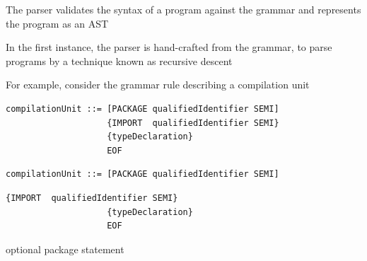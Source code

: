 \documentclass[8pt,a4paper,compress]{beamer}
\begin{document}
\begin{frame}[fragile]
\pause\transdissolve

The parser validates the syntax of a \jmm program against the \jmm grammar and represents the program as an AST

\pause\transdissolve\bigskip

In the first instance, the parser is hand-crafted from the grammar, to parse programs by a technique known as recursive descent

\pause\transdissolve\bigskip

For example, consider the grammar rule describing a compilation unit

\pause\transdissolve\smallskip

\begin{overprint}
\begin{tcolorbox}[enhanced,drop shadow southwest,sharp corners,size=fbox,colback=white,fontlower=\small\ttfamily,collower=silver900]

\begin{lstlisting}[language={},style=focusin]
compilationUnit ::= [PACKAGE qualifiedIdentifier SEMI]
                    {IMPORT  qualifiedIdentifier SEMI}
                    {typeDeclaration} 
                    EOF
\end{lstlisting}

\tcblower
\begin{minipage}[t][.25cm][t]{\textwidth}

\end{minipage}
\end{tcolorbox}

\begin{tcolorbox}[enhanced,drop shadow southwest,sharp corners,size=fbox,colback=white,fontlower=\small\ttfamily,collower=silver900]

\begin{lstlisting}[language={},style=focusin,backgroundcolor=\color{lime100}]
compilationUnit ::= [PACKAGE qualifiedIdentifier SEMI]
\end{lstlisting}
\begin{lstlisting}[language={},style=focusout]
                    {IMPORT  qualifiedIdentifier SEMI}
                    {typeDeclaration} 
                    EOF
\end{lstlisting}

\tcblower
\begin{minipage}[t][.25cm][t]{\textwidth}
optional package statement
\end{minipage}
\end{tcolorbox}


\end{overprint}
\end{frame}
\end{document}
